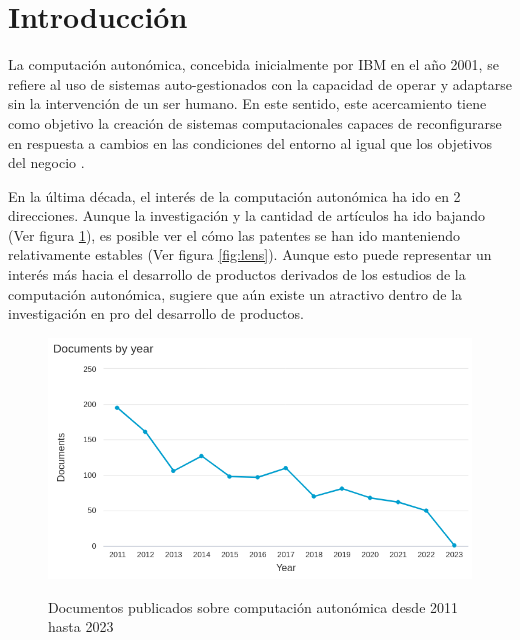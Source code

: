 \documentclass[12pt]{article}
\begin{document}
    
    
    \section{Introducción}


    La computación autonómica, concebida inicialmente por IBM en el año 2001, se refiere al uso de sistemas auto-gestionados con la capacidad de operar y adaptarse sin la intervención de un ser humano. En este sentido, este acercamiento tiene como objetivo la creación de sistemas computacionales capaces de reconfigurarse en respuesta a cambios en las condiciones del entorno al igual que los objetivos del negocio \cite{horn_2001}.

    
    En la última década, el interés de la computación autonómica ha ido en 2 direcciones. Aunque la investigación y la cantidad de artículos ha ido bajando (Ver figura \ref{fig:scopus}), es posible ver el cómo las patentes se han ido manteniendo relativamente estables (Ver figura \ref{fig:lens}). Aunque esto puede representar un interés más hacia el desarrollo de productos derivados de los estudios de la computación autonómica, sugiere que aún existe un atractivo dentro de la investigación en pro del desarrollo de productos. 

    \begin{figure}[h]
        \centering
        \includegraphics[scale=0.5]{Images/Scopus.png}
        \caption{Documentos publicados sobre computación autonómica desde 2011 hasta 2023} \cite{scopus} 
        \label{fig:scopus}
    \end{figure}
\end{document}
